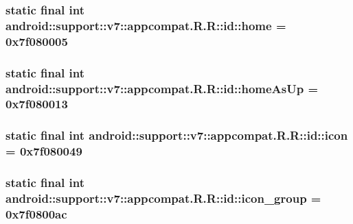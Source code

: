 \hypertarget{classandroid_1_1support_1_1v7_1_1appcompat_1_1_r_1_1id_d59ff61e9a5a63bd430f71db2ea85daa}{
\subsubsection[{home}]{\setlength{\rightskip}{0pt plus 5cm}static final int android::support::v7::appcompat.R.R::id::home = 0x7f080005}}
\label{classandroid_1_1support_1_1v7_1_1appcompat_1_1_r_1_1id_d59ff61e9a5a63bd430f71db2ea85daa}


\hypertarget{classandroid_1_1support_1_1v7_1_1appcompat_1_1_r_1_1id_ae355003a56599145828017929df786b}{
\subsubsection[{homeAsUp}]{\setlength{\rightskip}{0pt plus 5cm}static final int android::support::v7::appcompat.R.R::id::homeAsUp = 0x7f080013}}
\label{classandroid_1_1support_1_1v7_1_1appcompat_1_1_r_1_1id_ae355003a56599145828017929df786b}


\hypertarget{classandroid_1_1support_1_1v7_1_1appcompat_1_1_r_1_1id_b6706da8689079958bc431f460fcf690}{
\subsubsection[{icon}]{\setlength{\rightskip}{0pt plus 5cm}static final int android::support::v7::appcompat.R.R::id::icon = 0x7f080049}}
\label{classandroid_1_1support_1_1v7_1_1appcompat_1_1_r_1_1id_b6706da8689079958bc431f460fcf690}


\hypertarget{classandroid_1_1support_1_1v7_1_1appcompat_1_1_r_1_1id_fc787b62f6498146760e824f15e51e72}{
\subsubsection[{icon\_\-group}]{\setlength{\rightskip}{0pt plus 5cm}static final int android::support::v7::appcompat.R.R::id::icon\_\-group = 0x7f0800ac}}
\label{classandroid_1_1support_1_1v7_1_1appcompat_1_1_r_1_1id_fc787b62f6498146760e824f15e51e72}


